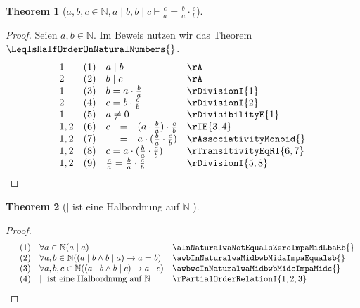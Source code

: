 \documentclass{book}
\theoremstyle{plain}
\newtheorem{theorem}{Theorem}
\theoremstyle{remark}
\theoremstyle{definition}
\begin{document}
\label{awbwcInNaturalwaMidbwbMidcImpLpaRpDurchLpcRpEqualsLpbRpDurchLpaRpMultLpcRpDurchLpbRp}
\begin{theorem}[\(a,b,c\in\mathbb{N}, a\mid b, b\mid c \vdash \frac{c}{a}=\frac{b}{a}\cdot\frac{c}{b}\)]
\end{theorem}
\begin{proof}
Seien \(a,b\in\mathbb{N}\).
Im Beweis nutzen wir das Theorem \(\LeqIsHalfOrderOnNaturalNumbers{}\). 
    \[
	\begin{array}{llclll}
        1       &  (1)  & \multicolumn{3}{l}{a\mid b} & \rA \\
        2       &  (2)  & \multicolumn{3}{l}{b\mid c} & \rA \\
        1       &  (3)  & \multicolumn{3}{l}{b=a\cdot \frac{b}{a}} & \rDivisionI{1} \\
        2       &  (4)  & \multicolumn{3}{l}{c=b\cdot \frac{c}{b}} & \rDivisionI{2} \\
        1       &  (5)  & \multicolumn{3}{l}{a\neq 0} & \rDivisibilityE{1} \\
        1,2     &  (6)  & c&=&(a\cdot \frac{b}{a})\cdot \frac{c}{b} & \rIE{3,4} \\
        1,2     &  (7)  & &=&a\cdot (\frac{b}{a}\cdot \frac{c}{b}) & \rAssociativityMonoid{} \\
        1,2     &  (8)  & \multicolumn{3}{l}{c=a\cdot (\frac{b}{a}\cdot \frac{c}{b})} & \rTransitivityEqRI{6,7} \\
        1,2     &  (9)  & \multicolumn{3}{l}{\frac{c}{a}=\frac{b}{a}\cdot \frac{c}{b}} & \rDivisionI{5,8} \\
        \end{array}
    \]
\end{proof}

\label{MidIsHalfOrderOnNaturalNumbers}
\begin{theorem}[\(\mid\) ist eine Halbordnung auf \(\mathbb{N}\) ]
\end{theorem}
\begin{proof}
        \[
	\begin{array}{llll}
                    & (1) & \forall a \in \mathbb{N}  (a \mid a) & \aInNaturalwaNotEqualsZeroImpaMidLbaRb{} \\
                    & (2) & \forall a, b \in \mathbb{N}  ((a \mid b \land b \mid a) \rightarrow a = b) & \awbInNaturalwaMidbwbMidaImpaEqualsb{} \\
                    & (3) & \forall a, b, c \in \mathbb{N}  ((a \mid b \land b \mid c) \rightarrow a \mid c) & \awbwcInNaturalwaMidbwbMidcImpaMidc{} \\
                    & (4) & \mid \text{ ist eine Halbordnung auf } \mathbb{N} &  \rPartialOrderRelationI{1,2,3}
    \end{array}
	\]
\end{proof}
\end{document}
